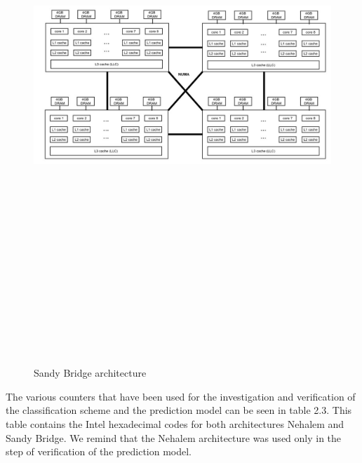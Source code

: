\documentclass[diploma]{Styles/softlab-thesis}
\begin{document}
\begin{figure}[ht!]
\begin{center}
\hspace*{-1cm}
\includegraphics[width=175mm, height=210mm]{images/sandman-architecture.jpg}
\caption{Sandy Bridge architecture  \label{overflow}}
\end{center}
\end{figure}

The various counters that have been used for the investigation and verification of the classification scheme and the prediction model can be seen in table 2.3. This table contains the Intel hexadecimal codes for both architectures Nehalem and Sandy Bridge. We remind that the Nehalem architecture was used only in the step of verification of the prediction model.
\end{document}
